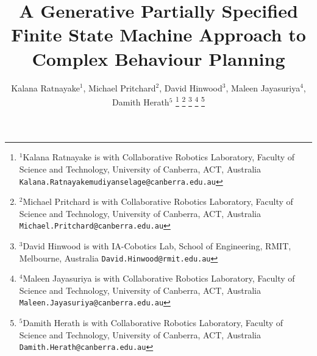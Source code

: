 \documentclass[letterpaper, 10pt, conference]{ieeeconf}      %
\begin{document}
\title{A Generative Partially Specified Finite State Machine Approach to Complex Behaviour Planning}

\author{Kalana Ratnayake$^{1}$, Michael Pritchard$^{2}$, David Hinwood$^{3}$, Maleen Jayasuriya$^{4}$, Damith Herath$^{5}$%
\thanks{$^{1}$Kalana Ratnayake is with Collaborative Robotics Laboratory, Faculty of Science and Technology, University of Canberra, ACT, Australia {\tt\small Kalana.Ratnayakemudiyanselage@canberra.edu.au}}%
\thanks{$^{2}$Michael Pritchard is with Collaborative Robotics Laboratory, Faculty of Science and Technology, University of Canberra, ACT, Australia {\tt\small Michael.Pritchard@canberra.edu.au}}%
\thanks{$^{3}$David Hinwood is with IA-Cobotics Lab, School of Engineering, RMIT, Melbourne, Australia {\tt\small David.Hinwood@rmit.edu.au}}%
\thanks{$^{4}$Maleen Jayasuriya is with Collaborative Robotics Laboratory, Faculty of Science and Technology, University of Canberra, ACT, Australia {\tt\small Maleen.Jayasuriya@canberra.edu.au}}%
\thanks{$^{5}$Damith Herath is with Collaborative Robotics Laboratory, Faculty of Science and Technology, University of Canberra, ACT, Australia {\tt\small Damith.Herath@canberra.edu.au}}%
}

\maketitle
\end{document}
